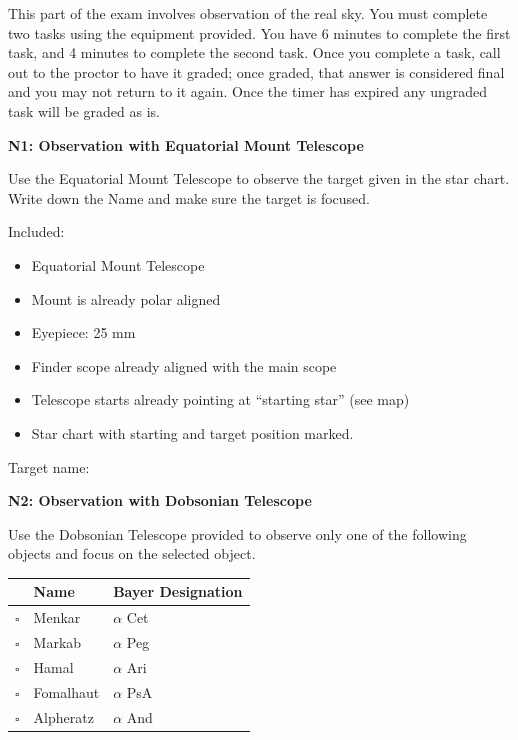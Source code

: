 
This part of the exam involves observation of the real sky. You must
complete two tasks using the equipment provided. You have 6 minutes to
complete the first task, and 4 minutes to complete the second task. Once you
complete a task, call out to the proctor to have it graded; once graded,
that answer is considered final and you may not return to it again. Once the
timer has expired any ungraded task will be graded as is.

\textbf{N1: Observation with Equatorial Mount Telescope}

Use the Equatorial Mount Telescope to observe the target given in the star
chart. Write down the Name and make sure the target is focused.

Included:
\begin{itemize}
\item Equatorial Mount Telescope
\item Mount is already polar aligned
\item Eyepiece: 25 mm
\item Finder scope already aligned with the main scope
\item Telescope starts already pointing at ``starting star'' (see map)
\item Star chart with starting and target position marked.
\end{itemize}

Target name: \underline{\hspace{5cm}}


\textbf{N2: Observation with Dobsonian Telescope}

Use the Dobsonian Telescope provided to observe only one of the following
objects and focus on the selected object.

\begin{center}
\begin{tabular}{cll}
 & Name & Bayer Designation \\
\hline
$\square$ & Menkar & $\alpha$ Cet \\
$\square$ & Markab & $\alpha$ Peg \\
$\square$ & Hamal & $\alpha$ Ari \\
$\square$ & Fomalhaut & $\alpha$ PsA \\
$\square$ & Alpheratz & $\alpha$ And \\
\end{tabular}
\end{center}

